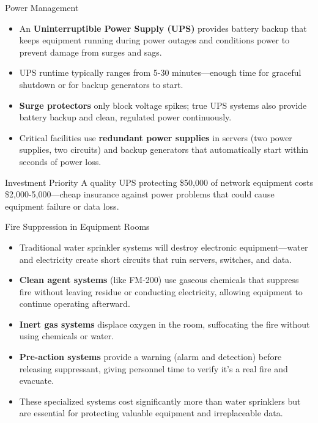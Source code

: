 \documentclass[aspectratio=169]{beamer}
\begin{document}
\begin{frame}{Power Management}
    \begin{itemize}
        \item An \textbf{Uninterruptible Power Supply (UPS)} provides battery backup that keeps equipment running during power outages and conditions power to prevent damage from surges and sags.
        \item UPS runtime typically ranges from 5-30 minutes---enough time for graceful shutdown or for backup generators to start.
        \item \textbf{Surge protectors} only block voltage spikes; true UPS systems also provide battery backup and clean, regulated power continuously.
        \item Critical facilities use \textbf{redundant power supplies} in servers (two power supplies, two circuits) and backup generators that automatically start within seconds of power loss.
    \end{itemize}
    
    \vspace{0.3cm}
    \begin{alertblock}{Investment Priority}
        A quality UPS protecting \$50,000 of network equipment costs \$2,000-5,000---cheap insurance against power problems that could cause equipment failure or data loss.
    \end{alertblock}
\end{frame}

\begin{frame}{Fire Suppression in Equipment Rooms}
    \begin{itemize}
        \item Traditional water sprinkler systems will destroy electronic equipment---water and electricity create short circuits that ruin servers, switches, and data.
        \item \textbf{Clean agent systems} (like FM-200) use gaseous chemicals that suppress fire without leaving residue or conducting electricity, allowing equipment to continue operating afterward.
        \item \textbf{Inert gas systems} displace oxygen in the room, suffocating the fire without using chemicals or water.
        \item \textbf{Pre-action systems} provide a warning (alarm and detection) before releasing suppressant, giving personnel time to verify it's a real fire and evacuate.
        \item These specialized systems cost significantly more than water sprinklers but are essential for protecting valuable equipment and irreplaceable data.
    \end{itemize}
\end{frame}
\end{document}

